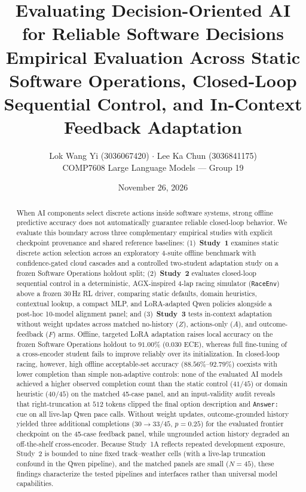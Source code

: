 \documentclass[11pt,a4paper]{article}
\title{\textbf{Evaluating Decision-Oriented AI for Reliable Software Decisions}\\[4pt]
\large Empirical Evaluation Across Static Software Operations, Closed-Loop Sequential Control, and In-Context Feedback Adaptation}
\author{Lok Wang Yi (3036067420) $\cdot$ Lee Ka Chun (3036841175) \\ \small COMP7608 Large Language Models --- Group 19}
\date{November 26, 2026}
\begin{document}
\maketitle

\begin{abstract}
\noindent
When AI components select discrete actions inside software systems, strong offline predictive accuracy does not automatically guarantee reliable closed-loop behavior. We evaluate this boundary across three complementary empirical studies with explicit checkpoint provenance and shared reference baselines: (1)~\textbf{Study~1} examines static discrete action selection across an exploratory 4-suite offline benchmark with confidence-gated cloud cascades and a controlled two-student adaptation study on a frozen Software Operations holdout split; (2)~\textbf{Study~2} evaluates closed-loop sequential control in a deterministic, AGX-inspired 4-lap racing simulator (\texttt{RaceEnv}) above a frozen 30\,Hz RL driver, comparing static defaults, domain heuristics, contextual lookup, a compact MLP, and LoRA-adapted Qwen policies alongside a post-hoc 10-model alignment panel; and (3)~\textbf{Study~3} tests in-context adaptation without weight updates across matched no-history ($Z$), actions-only ($A$), and outcome-feedback ($F$) arms. Offline, targeted LoRA adaptation raises local accuracy on the frozen Software Operations holdout to $91.00\%$ ($0.030$ ECE), whereas full fine-tuning of a cross-encoder student fails to improve reliably over its initialization. In closed-loop racing, however, high offline acceptable-set accuracy ($88.56\%$--$92.79\%$) coexists with lower completion than simple non-adaptive controls: none of the evaluated AI models achieved a higher observed completion count than the static control ($41/45$) or domain heuristic ($40/45$) on the matched 45-case panel, and an input-validity audit reveals that right-truncation at $512$ tokens clipped the final option description and \texttt{Answer:} cue on all live-lap Qwen pace calls. Without weight updates, outcome-grounded history yielded three additional completions ($30 \rightarrow 33/45$, $p=0.25$) for the evaluated frontier checkpoint on the 45-case feedback panel, while ungrounded action history degraded an off-the-shelf cross-encoder. Because Study~1A reflects repeated development exposure, Study~2 is bounded to nine fixed track--weather cells (with a live-lap truncation confound in the Qwen pipeline), and the matched panels are small ($N=45$), these findings characterize the tested pipelines and interfaces rather than universal model capabilities.
\end{abstract}
\end{document}
